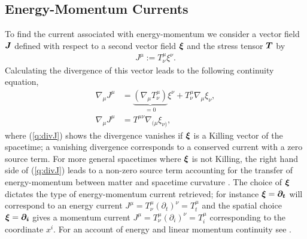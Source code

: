\subsection{Energy-Momentum Currents} \label{q:sect:mattercont}
To find the current associated with energy-momentum we consider a vector field $\boldsymbol{J}$ defined with respect to a second vector field $\boldsymbol{\xi}$ and the stress tensor $\boldsymbol{T}$ by
\begin{align}
\label{q:Killing current}J^\mu := T^\mu_\nu \xi^\nu.
\end{align}
Calculating the divergence of this vector leads to the following continuity equation,
\begin{align}
\nabla_\mu J^\mu &= \underbrace{(\nabla_\mu T^\mu_\nu )}_{=0}\xi^\nu + T^\mu_\nu \nabla_\mu  \xi_\nu, \\
\label{q:divJ}\nabla_\mu J^\mu &= T^{\mu\nu} \nabla_{(\mu}  \xi_{\nu)},
\end{align}
where (\ref{q:divJ}) shows the divergence vanishes if $\boldsymbol{\xi}$ is a Killing vector of the spacetime; a vanishing divergence corresponds to a conserved current with a zero source term. For more general spacetimes where $\boldsymbol{\xi}$ is not Killing, the right hand side of (\ref{q:divJ}) leads to a non-zero source term accounting for the transfer of energy-momentum between matter and spacetime curvature \cite{Clough_2021}. The choice of $\boldsymbol{\xi}$ dictates the type of energy-momentum current retrieved; for instance $\boldsymbol{\xi} = \boldsymbol{\partial_t}$ will correspond to an energy current $J^\mu = T^\mu_\nu (\partial_t)^\nu = T^\mu_t$ and the spatial choice $\boldsymbol{\xi} = \boldsymbol{\partial_i}$ gives a momentum current $J^\mu = T^\mu_\nu (\partial_i)^\nu=T^\mu_i$ corresponding to the coordinate $x^i$. For an account of energy and linear momentum continuity see \cite{Clough_2021}.




